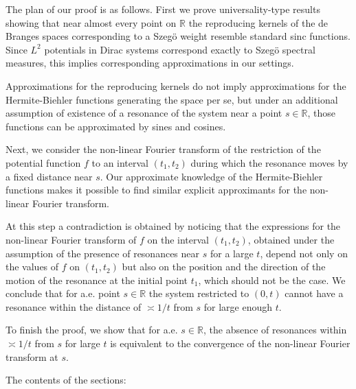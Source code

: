 \documentclass[11pt,twoside,reqno]{amsart}
\def\R{{\mathbb R}}
\theoremstyle{plain}
\numberwithin{equation}{section}
\begin{document}
\qquad

The plan of our proof is as follows. First we prove universality-type results showing that near almost every point on $\R$
the reproducing kernels of the de Branges spaces corresponding to  a Szeg\"o weight
resemble standard sinc functions. 
Since $L^2$ potentials in Dirac systems correspond exactly to Szeg\"o spectral measures, this implies corresponding approximations in our settings.

Approximations for the reproducing
kernels do not imply approximations for the Hermite-Biehler functions generating the space per se, but under an additional assumption of existence of a resonance
of the system
near a point $s\in\R$, those functions can be approximated by sines and cosines. 

Next, we consider the non-linear Fourier transform
of the restriction  of the potential function $f$ to an interval $(t_1,t_2)$ during which the resonance moves by a fixed distance near $s$. Our approximate knowledge of the Hermite-Biehler functions makes it possible to find similar explicit approximants for  the non-linear Fourier transform. 

At this step a contradiction is obtained by noticing that the expressions for the non-linear Fourier transform of $f$ on the interval $(t_1,t_2)$, obtained under the assumption of the presence of resonances near $s$ for a large $t$, depend not only on 
the values of $f$  on $(t_1,t_2)$ but also on the position and the direction of the motion of the resonance at the initial point $t_1$, which should not be the case. We conclude that 
 for a.e. point $s\in\R$ the system restricted to $(0,t)$ cannot have a resonance  within the distance of $\asymp 1/t$ from $s$ for large enough $t$. 
 
 To finish the proof, we show that for a.e. $s\in\R$, the absence of resonances within $\asymp 1/t$ from $s$ for large $t$ is equivalent to the convergence of
  the non-linear Fourier transform at $s$. 


The contents of the sections:
\end{document}
